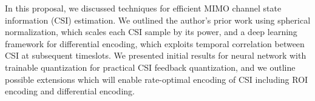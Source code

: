 
In this proposal, we discussed techniques for efficient MIMO channel state information (CSI) estimation. We outlined the author's prior work using spherical normalization, which scales each CSI sample by its power, and a deep learning framework for differential encoding, which exploits temporal correlation between CSI at subsequent timeslots. We presented initial results for neural network with trainable quantization for practical CSI feedback quantization, and we outline possible extensions which will enable rate-optimal encoding of CSI including ROI encoding and differential encoding.